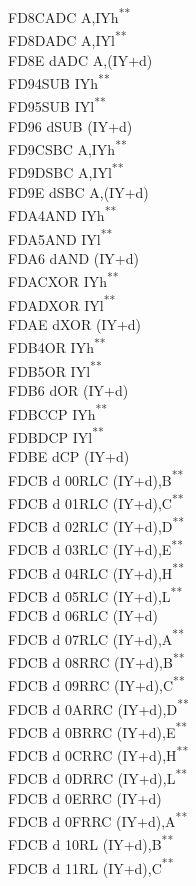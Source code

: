 \documentclass[12pt,twoside,openright,a4paper]{book}
\newcommand{\UNDOC}{\textnormal{\textsuperscript{**}}}
\begin{document}
\begin{multicols}{3}
{\begin{tabbing}
	FD8C\>ADC A,IYh\UNDOC\\
	FD8D\>ADC A,IYl\UNDOC\\
	FD8E d\>ADC A,(IY+d)\\
	FD94\>SUB IYh\UNDOC\\
	FD95\>SUB IYl\UNDOC\\
	FD96 d\>SUB (IY+d)\\
	FD9C\>SBC A,IYh\UNDOC\\
	FD9D\>SBC A,IYl\UNDOC\\
	FD9E d\>SBC A,(IY+d)\\
	FDA4\>AND IYh\UNDOC\\
	FDA5\>AND IYl\UNDOC\\
	FDA6 d\>AND (IY+d)\\
	FDAC\>XOR IYh\UNDOC\\
	FDAD\>XOR IYl\UNDOC\\
	FDAE d\>XOR (IY+d)\\
	FDB4\>OR IYh\UNDOC\\
	FDB5\>OR IYl\UNDOC\\
	FDB6 d\>OR (IY+d)\\
	FDBC\>CP IYh\UNDOC\\
	FDBD\>CP IYl\UNDOC\\
	FDBE d\>CP (IY+d)\\
	FDCB d 00\>RLC (IY+d),B\UNDOC\\
	FDCB d 01\>RLC (IY+d),C\UNDOC\\
	FDCB d 02\>RLC (IY+d),D\UNDOC\\
	FDCB d 03\>RLC (IY+d),E\UNDOC\\
	FDCB d 04\>RLC (IY+d),H\UNDOC\\
	FDCB d 05\>RLC (IY+d),L\UNDOC\\
	FDCB d 06\>RLC (IY+d)\\
	FDCB d 07\>RLC (IY+d),A\UNDOC\\
	FDCB d 08\>RRC (IY+d),B\UNDOC\\
	FDCB d 09\>RRC (IY+d),C\UNDOC\\
	FDCB d 0A\>RRC (IY+d),D\UNDOC\\
	FDCB d 0B\>RRC (IY+d),E\UNDOC\\
	FDCB d 0C\>RRC (IY+d),H\UNDOC\\
	FDCB d 0D\>RRC (IY+d),L\UNDOC\\
	FDCB d 0E\>RRC (IY+d)\\
	FDCB d 0F\>RRC (IY+d),A\UNDOC\\
	FDCB d 10\>RL (IY+d),B\UNDOC\\
	FDCB d 11\>RL (IY+d),C\UNDOC\\

\end{tabbing}}
\end{multicols}
\end{document}
